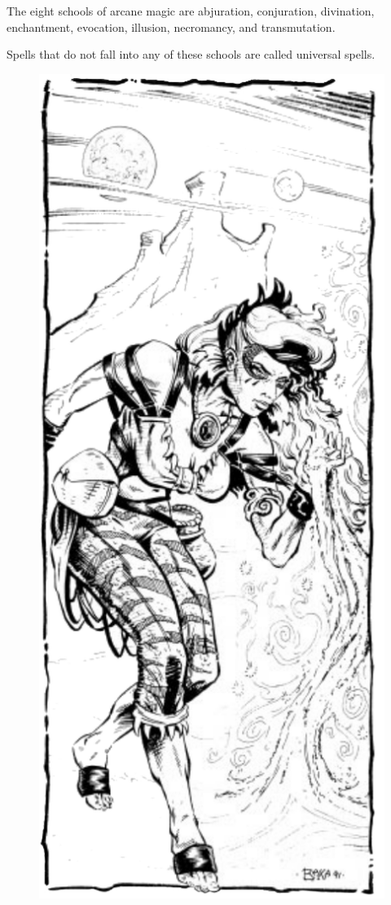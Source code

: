 The eight schools of arcane magic are abjuration, conjuration, divination, enchantment, evocation, illusion, necromancy, and transmutation.

Spells that do not fall into any of these schools are called universal spells.

\begin{figure}[t!]
\centering
\includegraphics[width=\columnwidth]{images/wizard-2.png}
\WOTC
\end{figure}


